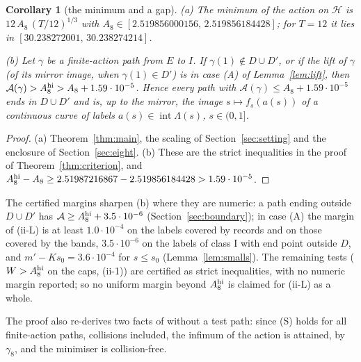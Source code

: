 \documentclass[11pt]{article}
\newtheorem{corollary}[theorem]{Corollary}
\theoremstyle{definition}
\begin{document}
\begin{corollary}[the minimum and a gap]\label{cor:gap}
(a) The minimum of the action on $\mathcal H$ is $12\,A_8\,(T/12)^{1/3}$ with $A_8\in[2.519856000156,\,2.519856184428]$;
for $T=12$ it lies in $[30.238272001,\,30.238274214]$.

(b) Let $\gamma$ be a finite-action path from $E$ to $I$. If $\gamma(1)\notin D\cup D'$, or if the lift of $\gamma$ (of
its mirror image, when $\gamma(1)\in D'$) is in case (A) of Lemma~\ref{lem:lift}, then
$\mathcal A(\gamma)>A_8^{\rm hi}>A_8+1.59\cdot10^{-5}$. Hence every path with $\mathcal A(\gamma)\le A_8+1.59\cdot10^{-5}$
ends in $D\cup D'$ and is, up to the mirror, the image $s\mapsto f_s(a(s))$ of a continuous curve of labels
$a(s)\in\operatorname{int}\Lambda(s)$, $s\in(0,1]$.
\end{corollary}
\begin{proof}
(a) Theorem~\ref{thm:main}, the scaling of Section~\ref{sec:setting} and the enclosure of Section~\ref{sec:eight}.
(b) These are the strict inequalities in the proof of Theorem~\ref{thm:criterion}, and
$A_8^{\rm hi}-A_8\ge2.51987216867-2.519856184428>1.59\cdot10^{-5}$.
\end{proof}
The certified margins sharpen (b) where they are numeric: a path ending outside $D\cup D'$ has
$\mathcal A\ge A_8^{\rm hi}+3.5\cdot10^{-6}$ (Section~\ref{sec:boundary}); in case (A) the margin of (ii-L) is at least
$1.0\cdot10^{-4}$ on the labels covered by records and on those covered by the bands, $3.5\cdot10^{-6}$ on the labels
of class I with end point outside $D$, and $m'-Ks_0=3.6\cdot10^{-4}$ for $s\le s_0$ (Lemma~\ref{lem:smalls}). The
remaining tests ($W>A_8^{\rm hi}$ on the caps, (ii-1)) are certified as strict inequalities, with no numeric margin
reported; so no uniform margin beyond $A_8^{\rm hi}$ is claimed for (ii-L) as a whole.

The proof also re-derives two facts of \cite{CM} without a test path: since (S) holds for all finite-action paths,
collisions included, the infimum of the action is attained, by $\gamma_8$, and the minimiser is collision-free.
\end{document}
